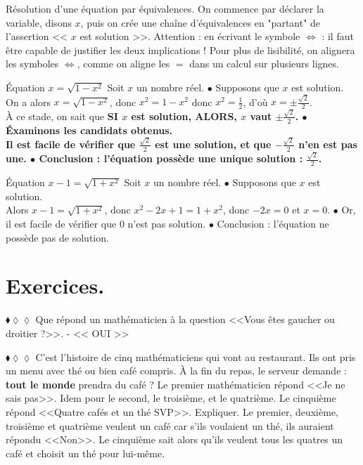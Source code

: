 \documentclass[11pt]{article}
\begin{document}
\begin{meth}{Résolution d'une équation par équivalences.}{}
    On commence par déclarer la variable, disons $x$, puis on crée une chaîne d'équivalences en "partant" de l'assertion << $x$ est solution >>.\n
    Attention : en écrivant le symbole $\iff$ : il faut être capable de justifier les deux implications !\n
    Pour plus de lisibilité, on alignera les symboles $\iff$, comme on aligne les $=$ dans un calcul sur plusieurs lignes.
\end{meth}

\begin{ex}{Équation $x=\sqrt{1-x^2}$}{}
    Soit $x$ un nombre réel.\n
    $\bullet$ Supposons que $x$ est solution.\\
    On a alors $x=\sqrt{1-x^2}$, donc $x^2=1-x^2$ donc $x^2=\frac{1}{2}$, d'où $x=\pm\frac{\sqrt{2}}{2}$.\\
    À ce stade, on sait que \bf{SI} $x$ est solution, \bf{ALORS}, $x$ vaut $\pm\frac{\sqrt{2}}{2}$.\n
    $\bullet$ Éxaminons les candidats obtenus.\\
    Il est facile de vérifier que $\frac{\sqrt{2}}{2}$ est une solution, et que $-\frac{\sqrt{2}}{2}$ n'en est pas une.\n
    $\bullet$ Conclusion : l'équation possède une unique solution : $\frac{\sqrt{2}}{2}$.
\end{ex}

\begin{ex}{Équation $x-1=\sqrt{1+x^2}$}{}
    Soit $x$ un nombre réel.\n
    $\bullet$ Supposons que $x$ est solution.\\
    Alors $x-1=\sqrt{1+x^2}$, donc $x^2-2x+1=1+x^2$, donc $-2x=0$ et $x=0$.\n
    $\bullet$ Or, il est facile de vérifier que 0 n'est pas solution.\n
    $\bullet$ Conclusion : l'équation ne possède pas de solution.
\end{ex}

\section{Exercices.}

\begin{exercice}{$\blacklozenge\lozenge\lozenge$}{}
    Que répond un mathématicien à la question <<Vous êtes gaucher ou droitier ?>>.
    \tcblower
    - << OUI >>
\end{exercice}

\begin{exercice}{$\blacklozenge\lozenge\lozenge$}{}
    C'est l'histoire de cinq mathématiciens qui vont au restaurant. Ils ont pris un menu avec thé ou bien café compris. À la fin du repas, le serveur demande : \textbf{tout le monde} prendra du café ? Le premier mathématicien répond <<Je ne sais pas>>. Idem pour le second, le troisième, et le quatrième. Le cinquième répond <<Quatre cafés et un thé SVP>>. Expliquer.
    \tcblower
    Le premier, deuxième, troisième et quatrième veulent un café car s'ils voulaient un thé, ils auraient répondu <<Non>>. Le cinquième sait alors qu'ils veulent tous les quatres un café et choisit un thé pour lui-même. 
\end{exercice}
\end{document}
